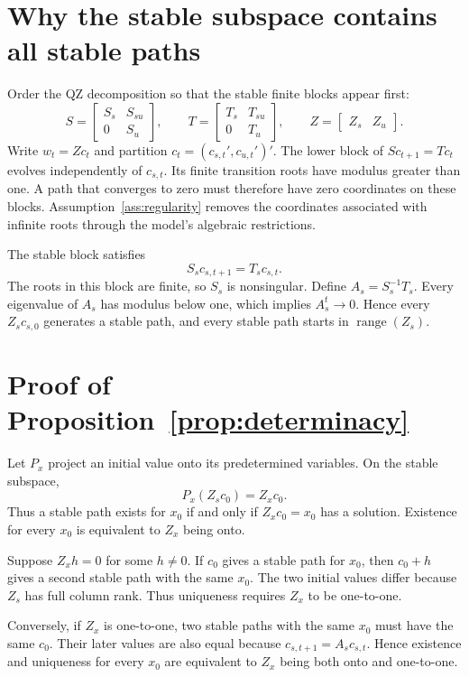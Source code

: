 \documentclass[11pt]{article}
\begin{document}
\appendix

\section{Why the stable subspace contains all stable paths}

Order the QZ decomposition so that the stable finite blocks appear first:
\[
    S=\begin{bmatrix}S_s&S_{su}\\0&S_u\end{bmatrix},
    \qquad
    T=\begin{bmatrix}T_s&T_{su}\\0&T_u\end{bmatrix},
    \qquad
    Z=\begin{bmatrix}Z_s&Z_u\end{bmatrix}.
\]
Write $w_t=Zc_t$ and partition $c_t=(c_{s,t}',c_{u,t}')'$. The lower block of
$Sc_{t+1}=Tc_t$ evolves independently of $c_{s,t}$. Its finite transition
roots have modulus greater than one. A path that converges to zero must
therefore have zero coordinates on these blocks. Assumption~\ref{ass:regularity}
removes the coordinates associated with infinite roots through the model's
algebraic restrictions.

The stable block satisfies
\[
    S_sc_{s,t+1}=T_sc_{s,t}.
\]
The roots in this block are finite, so $S_s$ is nonsingular. Define
$A_s=S_s^{-1}T_s$. Every eigenvalue of $A_s$ has modulus below one, which
implies $A_s^t\rightarrow0$. Hence every $Z_sc_{s,0}$ generates a stable path,
and every stable path starts in $\operatorname{range}(Z_s)$.

\section{Proof of Proposition~\ref{prop:determinacy}}

Let $P_x$ project an initial value onto its predetermined variables. On the
stable subspace,
\[
    P_x(Z_sc_0)=Z_xc_0.
\]
Thus a stable path exists for $x_0$ if and only if $Z_xc_0=x_0$ has a
solution. Existence for every $x_0$ is equivalent to $Z_x$ being onto.

Suppose $Z_xh=0$ for some $h\ne0$. If $c_0$ gives a stable path for $x_0$,
then $c_0+h$ gives a second stable path with the same $x_0$. The two initial
values differ because $Z_s$ has full column rank. Thus uniqueness requires
$Z_x$ to be one-to-one.

Conversely, if $Z_x$ is one-to-one, two stable paths with the same $x_0$ must
have the same $c_0$. Their later values are also equal because
$c_{s,t+1}=A_sc_{s,t}$. Hence existence and uniqueness for every $x_0$ are
equivalent to $Z_x$ being both onto and one-to-one.
\end{document}
